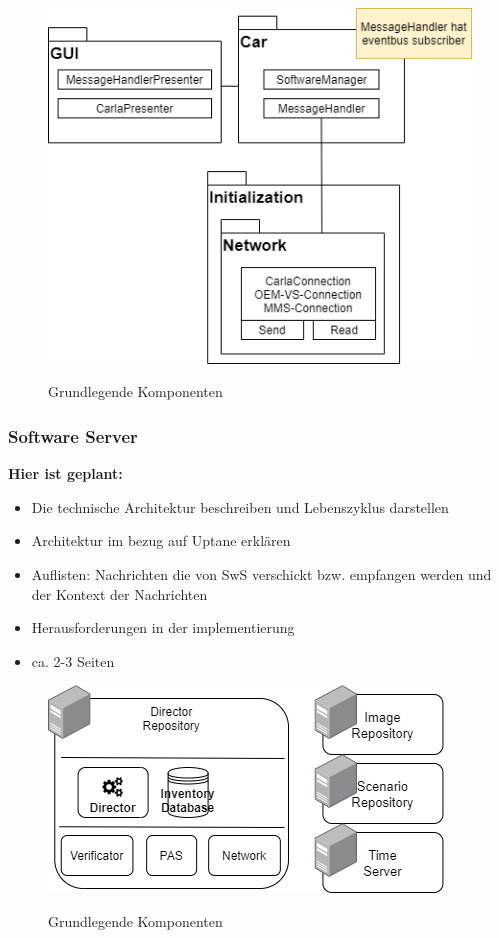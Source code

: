 \begin{figure}[!h]
	\centering
	\includegraphics[width=0.8\columnwidth]{pictures/ccu.png}
	\label{img:ccu}
	\caption{Grundlegende Komponenten}
\end{figure}



\subsubsection{Software Server}\label{server}
\textbf{Hier ist geplant:}
\begin{itemize}
	\item Die technische Architektur beschreiben und Lebenszyklus darstellen
	\item Architektur im bezug auf Uptane erklären
	\item Auflisten: Nachrichten die von SwS verschickt bzw. empfangen werden und der Kontext der Nachrichten
	\item Herausforderungen in der implementierung
	\item ca. 2-3 Seiten
\end{itemize}

\begin{figure}[!h]
	\centering
	\includegraphics[width=0.8\columnwidth]{pictures/sws.png}
	\label{img:sws}
	\caption{Grundlegende Komponenten}
\end{figure}

